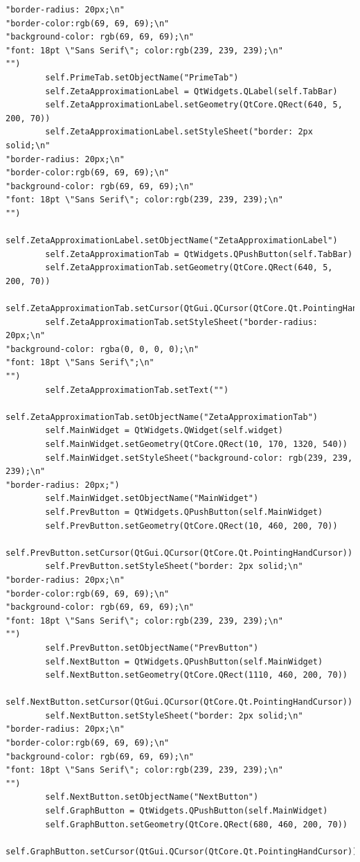 \documentclass{article}
\begin{document}
\begin{lstlisting}
"border-radius: 20px;\n"
"border-color:rgb(69, 69, 69);\n"
"background-color: rgb(69, 69, 69);\n"
"font: 18pt \"Sans Serif\"; color:rgb(239, 239, 239);\n"
"")
        self.PrimeTab.setObjectName("PrimeTab")
        self.ZetaApproximationLabel = QtWidgets.QLabel(self.TabBar)
        self.ZetaApproximationLabel.setGeometry(QtCore.QRect(640, 5, 200, 70))
        self.ZetaApproximationLabel.setStyleSheet("border: 2px solid;\n"
"border-radius: 20px;\n"
"border-color:rgb(69, 69, 69);\n"
"background-color: rgb(69, 69, 69);\n"
"font: 18pt \"Sans Serif\"; color:rgb(239, 239, 239);\n"
"")
        self.ZetaApproximationLabel.setObjectName("ZetaApproximationLabel")
        self.ZetaApproximationTab = QtWidgets.QPushButton(self.TabBar)
        self.ZetaApproximationTab.setGeometry(QtCore.QRect(640, 5, 200, 70))
        self.ZetaApproximationTab.setCursor(QtGui.QCursor(QtCore.Qt.PointingHandCursor))
        self.ZetaApproximationTab.setStyleSheet("border-radius: 20px;\n"
"background-color: rgba(0, 0, 0, 0);\n"
"font: 18pt \"Sans Serif\";\n"
"")
        self.ZetaApproximationTab.setText("")
        self.ZetaApproximationTab.setObjectName("ZetaApproximationTab")
        self.MainWidget = QtWidgets.QWidget(self.widget)
        self.MainWidget.setGeometry(QtCore.QRect(10, 170, 1320, 540))
        self.MainWidget.setStyleSheet("background-color: rgb(239, 239, 239);\n"
"border-radius: 20px;")
        self.MainWidget.setObjectName("MainWidget")
        self.PrevButton = QtWidgets.QPushButton(self.MainWidget)
        self.PrevButton.setGeometry(QtCore.QRect(10, 460, 200, 70))
        self.PrevButton.setCursor(QtGui.QCursor(QtCore.Qt.PointingHandCursor))
        self.PrevButton.setStyleSheet("border: 2px solid;\n"
"border-radius: 20px;\n"
"border-color:rgb(69, 69, 69);\n"
"background-color: rgb(69, 69, 69);\n"
"font: 18pt \"Sans Serif\"; color:rgb(239, 239, 239);\n"
"")
        self.PrevButton.setObjectName("PrevButton")
        self.NextButton = QtWidgets.QPushButton(self.MainWidget)
        self.NextButton.setGeometry(QtCore.QRect(1110, 460, 200, 70))
        self.NextButton.setCursor(QtGui.QCursor(QtCore.Qt.PointingHandCursor))
        self.NextButton.setStyleSheet("border: 2px solid;\n"
"border-radius: 20px;\n"
"border-color:rgb(69, 69, 69);\n"
"background-color: rgb(69, 69, 69);\n"
"font: 18pt \"Sans Serif\"; color:rgb(239, 239, 239);\n"
"")
        self.NextButton.setObjectName("NextButton")
        self.GraphButton = QtWidgets.QPushButton(self.MainWidget)
        self.GraphButton.setGeometry(QtCore.QRect(680, 460, 200, 70))
        self.GraphButton.setCursor(QtGui.QCursor(QtCore.Qt.PointingHandCursor))

\end{lstlisting}
\end{document}
